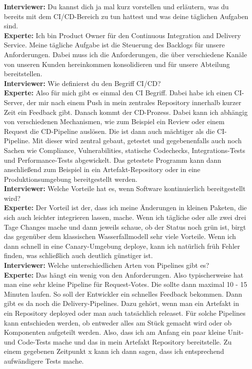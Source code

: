 \begin{linenumbers}
\textbf{Interviewer:} Du kannst dich ja mal kurz vorstellen und erläutern, was du bereits mit dem CI/CD-Bereich zu tun hattest und was deine täglichen Aufgaben sind.\\
\textbf{Experte:} Ich bin Product Owner für den Continuous Integration and Delivery Service. Meine tägliche Aufgabe ist die Steuerung des Backlogs für unsere Anforderungen. Dabei muss ich die Anforderungen, die über verschiedene Kanäle von unseren Kunden hereinkommen konsolidieren und für unsere Abteilung bereitstellen.\\
\textbf{Interviewer:} Wie definierst du den Begriff CI/CD?\\
\textbf{Experte:} Also für mich gibt es einmal den CI Begriff. Dabei habe ich einen CI-Server, der mir nach einem Push in mein zentrales Repository innerhalb kurzer Zeit ein Feedback gibt. Danach kommt der CD-Prozess. Dabei kann ich abhängig von verschiedenen Mechanismen, wie zum Beispiel ein Review oder einem Request die CD-Pipeline auslösen. Die ist dann auch mächtiger als die CI-Pipeline. Mit dieser wird zentral gebaut, getestet und gegebenenfalls auch noch Sachen wie Compliance, Vulnerabilities, statische Codechecks, Integrations-Tests und Performance-Tests abgewickelt. Das getestete Programm kann dann anschließend zum Beispiel in ein Artefakt-Repository oder in eine Produktionsumgebung bereitgestellt werden.\\
\textbf{Interviewer:} Welche Vorteile hat es, wenn Software kontinuierlich bereitgestellt wird?\\
\textbf{Experte:} Der Vorteil ist der, dass ich meine Änderungen in kleinen Paketen, die sich auch leichter integrieren lassen, mache. Wenn ich tägliche oder alle zwei drei Tage Changes mache und dann jeweils schaue, ob der Status noch grün ist, birgt das gegenüber dem klassischen Wasserfallmodell sehr viele Vorteile. Wenn ich dann schnell in eine Canary-Umgebung deploye, kann ich natürlich früh Fehler finden, was schließlich auch deutlich günstiger ist.\\
\textbf{Interviewer:} Welche unterschiedlichen Arten von Pipelines gibt es?\\
\textbf{Experte:} Das hängt ein wenig von den Anforderungen. Also typischerweise hat man eine sehr kleine Pipeline für Request-Votes. Die sollte dann maximal 10 - 15 Minuten laufen. So soll der Entwickler ein schnelles Feedback bekommen. Dann gibt es da noch die Delivery-Pipelines. Dazu gehört, wenn man ein Artefakt in ein Repository deployed oder man auch tatsächlich releaset. Für solche Pipelines kann entschieden werden, ob entweder alles am Stück gemacht wird oder ob Komponenten aufgeteilt werden. Also, dass ich am Anfang ein paar kleine Unit- und Code-Tests mache und das in mein Artefakt Repository bereitstelle. Zu einem gegebenen Zeitpunkt x kann ich dann sagen, dass ich entsprechend aufwändigere Tests mache.\\

\end{linenumbers}
